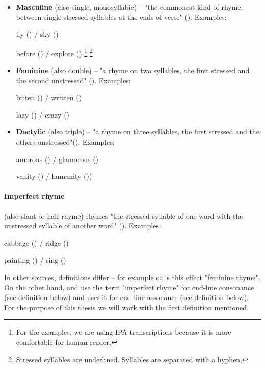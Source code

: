 \begin{itemize}
	\item \textbf{Masculine} (also single, monosyllabic) -- "the commonest kind of rhyme, between single stressed syllables at the ends of verse" (\cite{oxforddict2008literary}). 
	Examples: 
	
	fly () / sky ()
	
	before () / explore ()
	\footnote{For the examples, we are using IPA transcriptions because it is more comfortable for human reader.}
	\footnote{Stressed syllables are underlined. Syllables are separated with a hyphen.}
	
	\item \textbf{Feminine} (also double) -- "a rhyme on two syllables, the first stressed and the second unstressed" (\cite{oxforddict2008literary}). Examples: 
	
	bitten () / written ()
	
	lazy () / crazy ()
	
	\item \textbf{Dactylic} (also triple) -- "a rhyme on three syllables, the first stressed and the others unstressed"(\cite{oxforddict2008literary}). Examples: 
	
	amorous () / glamorous ()
	
	vanity () / humanity ())
	
\end{itemize}

\paragraph{Imperfect rhyme} (also slant or half rhyme)  rhymes "the stressed syllable of one word with the unstressed syllable of another word" (\cite{bergman2017litcharts}). Examples: 

cabbage () / ridge ()

painting () / ring ()

\noindent In other sources, definitions differ -- for example \cite{literarydevices2020} calls this effect "feminine rhyme".  On the other hand, \cite{oxforddict2008literary} and \cite{britannica} use the term "imperfect rhyme" for end-line consonance (see definition below) and \cite{vanphonological} uses it for end-line assonance (see definition below). For the purpose of this thesis we will work with the first definition mentioned.

